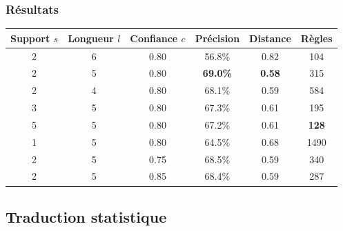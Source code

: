 \documentclass{beamer}
\begin{document}
\begin{frame}
\frametitle{Résultats}
\footnotesize
\begin{center}
\begin{tabular}{|c|c|c||c|c|c|}
\hline
Support $s$&Longueur $l$&Confiance $c$&Précision&Distance&Règles\\
\hline
2&6&0.80&56.8\%&0.82&104\\
\hline
2&5&0.80&\textbf{69.0\%}&\textbf{0.58}&315\\
\hline
2&4&0.80&68.1\%&0.59&584\\
\hline
\hline
3&5&0.80&67.3\%&0.61&195\\
\hline
5&5&0.80&67.2\%&0.61&\textbf{128}\\
\hline
1&5&0.80&64.5\%&0.68&1490\\
\hline
\hline
2&5&0.75&68.5\%&0.59&340\\
\hline
2&5&0.85&68.4\%&0.59&287\\
\hline
\end{tabular}
\end{center}
\normalsize
\end{frame}




\subsection{Traduction statistique}


\begin{frame}
\tableofcontents[sectionstyle=show/shaded, subsectionstyle=show/shaded/hide] 
\end{frame}
\end{document}
